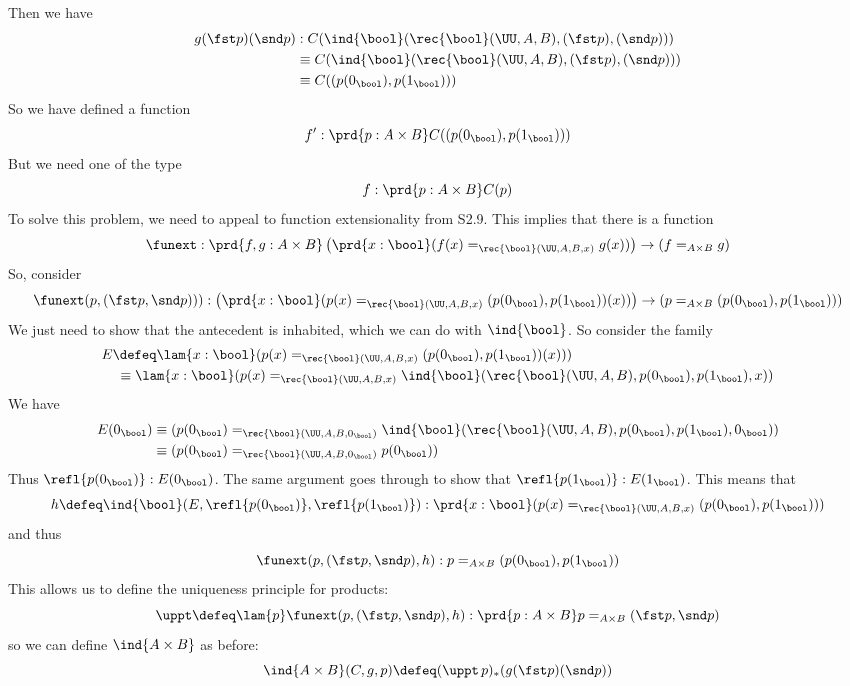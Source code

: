 Then we have
\begin{align*}
  g(\fst p)(\snd p) 
  &: C(\ind{\bool}(\rec{\bool}(\UU, A, B), (\fst p), (\snd p)))
  \\&\equiv 
  C(\ind{\bool}(\rec{\bool}(\UU, A, B), (\fst p), (\snd p)))
  \\&\equiv 
  C((p(0_{\bool}), p(1_{\bool})))
\end{align*}
So we have defined a function
\[
  f' : \prd{p : A \times B} C((p(0_{\bool}), p(1_{\bool})))
\]
But we need one of the type
\[
  f : \prd{p : A \times B} C(p)
\]
To solve this problem, we need to appeal to function extensionality from S2.9.
This implies that there is a function
\[
  \funext : 
  \prd{f, g : A \times B} 
    \left(\prd{x:\bool} (f(x) =_{\rec{\bool}(\UU, A, B, x)} g(x))\right)
    \to 
    (f =_{A \times B} g)
\]
So, consider
\[
  \funext(p, (\fst p, \snd p))) 
  :
  \left(\prd{x:\bool} (p(x) =_{\rec{\bool}(\UU, A, B, x)} (p(0_{\bool}),
    p(1_{\bool}))(x))\right)
  \to 
  (p =_{A \times B} (p(0_{\bool}), p(1_{\bool})))
\]
We just need to show that the antecedent is inhabited, which we can do with
$\ind{\bool}$.  So consider the family
\begin{align*}
  E &\defeq 
  \lam{x : \bool} 
  (p(x) =_{\rec{\bool}(\UU, A, B, x)} (p(0_{\bool}), p(1_{\bool}))(x)))
  \\&\phantom{:}\equiv
  \lam{x : \bool} 
  (p(x) =_{\rec{\bool}(\UU, A, B, x)} \ind{\bool}(\rec{\bool}(\UU, A, B),
  p(0_{\bool}), p(1_{\bool}), x))
\end{align*}
We have
\begin{align*}
  E(0_{\bool})
  &\equiv
  (p(0_{\bool}) =_{\rec{\bool}(\UU, A, B, 0_{\bool})} \ind{\bool}(\rec{\bool}(\UU, A, B),
  p(0_{\bool}), p(1_{\bool}), 0_{\bool}))
  \\&\equiv
  (p(0_{\bool}) =_{\rec{\bool}(\UU, A, B, 0_{\bool})} p(0_{\bool}))
\end{align*}
Thus $\refl{p(0_{\bool})} : E(0_{\bool})$.  The same argument goes through to
show that $\refl{p(1_{\bool})} : E(1_{\bool})$.  This means that
\[
  h \defeq
  \ind{\bool}(E, \refl{p(0_{\bool})}, \refl{p(1_{\bool})})
  :
  \prd{x : \bool} (p(x) =_{\rec{\bool}(\UU, A, B, x)} (p(0_{\bool}),
  p(1_{\bool})))
\]
and thus
\[
  \funext(p, (\fst p, \snd p), h) 
  : p =_{A \times B} (p(0_{\bool}),
  p(1_{\bool}))
\]
This allows us to define the uniqueness principle for products:
\[
\uppt \defeq \lam{p}\funext(p, (\fst p, \snd p), h)  
: \prd{p:A \times B} p =_{A \times B} (\fst p, \snd p)
\]
so we can define $\ind{A\times B}$ as before:
\[
  \ind{A\times B}(C, g, p) \defeq (\uppt\, p)_{*}(g(\fst p)(\snd p))
\]


